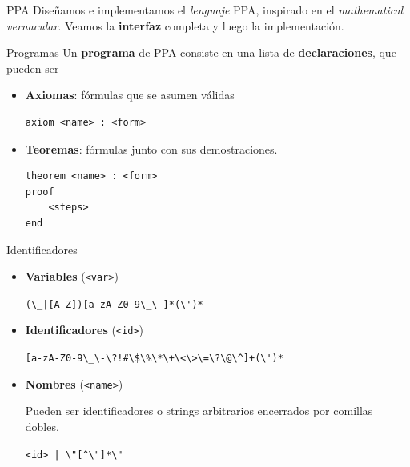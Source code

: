 \documentclass[xcolor={dvipsnames},spanish]{beamer}
\begin{document}
\begin{frame}[fragile]{PPA}
    Diseñamos e implementamos el \textit{lenguaje} PPA, inspirado en el
    \textit{mathematical vernacular}. Veamos la \textbf{interfaz} completa y luego la implementación.
    
\end{frame}

\begin{frame}[fragile]{Programas}
    Un \textbf{programa} de PPA consiste en una lista de \textbf{declaraciones},
    que pueden ser
    \begin{itemize}
        \item \textbf{Axiomas}: fórmulas que se asumen válidas
        \begin{lstlisting}[numbers=none]
axiom <name> : <form>
        \end{lstlisting}
        \item \textbf{Teoremas}: fórmulas junto con sus demostraciones.
\begin{lstlisting}[numbers=none]
theorem <name> : <form>
proof
    <steps>
end
\end{lstlisting}
    \end{itemize}
\end{frame}

\begin{frame}[fragile]{Identificadores}
    \begin{itemize}
        \item \textbf{Variables} (\lstinline{<var>})
        \begin{center}
            \verb/(\_|[A-Z])[a-zA-Z0-9\_\-]*(\')*/
        \end{center}
        \item \textbf{Identificadores} (\lstinline{<id>})
        \begin{center}
            \verb/[a-zA-Z0-9\_\-\?!#\$\%\*\+\<\>\=\?\@\^]+(\')*/
        \end{center}
        \item \textbf{Nombres} (\lstinline{<name>})
        
        Pueden ser identificadores o strings arbitrarios encerrados por comillas dobles.
        \begin{center}
            \verb/<id> | \"[^\"]*\"/
        \end{center}
    \end{itemize}
\end{frame}
\end{document}
